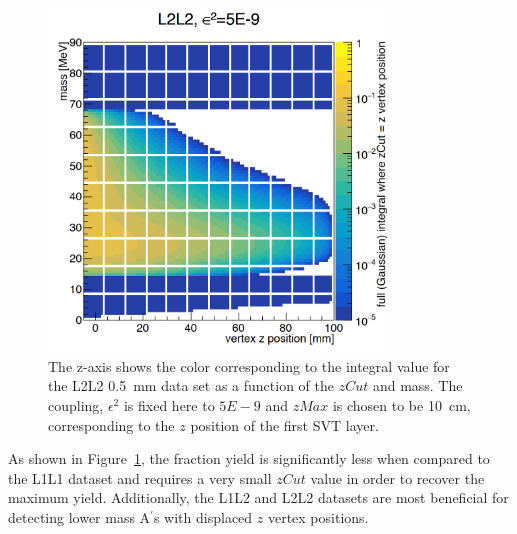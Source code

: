 \begin{figure}[H]
  \centering
      \includegraphics[width=0.8\textwidth]{pics/searching/integralEff22.png}
  \caption[Integral as a function of mass and $zCut$ for L2L2]{The z-axis shows the color corresponding to the integral value for the L2L2 0.5~mm data set as a function of the $zCut$ and mass. The coupling, $\epsilon^2$ is fixed here to $5E-9$ and $zMax$ is chosen to be 10~cm, corresponding to the $z$ position of the first SVT layer. }
  \label{fig:effIntegral22}
\end{figure}

As shown in Figure~\ref{fig:effIntegral22}, the fraction yield is significantly less when compared to the L1L1 dataset and requires a very small $zCut$ value in order to recover the maximum yield. Additionally, the L1L2 and L2L2 datasets are most beneficial for detecting lower mass A$^\prime$s with displaced $z$ vertex positions. 